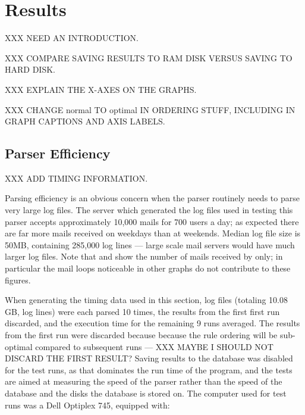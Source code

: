 \section{Results}

XXX NEED AN INTRODUCTION\@.

XXX COMPARE SAVING RESULTS TO RAM DISK VERSUS SAVING TO HARD DISK\@.

XXX EXPLAIN THE X-AXES ON THE GRAPHS\@.

XXX CHANGE normal TO optimal IN ORDERING STUFF, INCLUDING IN GRAPH CAPTIONS
AND AXIS LABELS\@.

\subsection{Parser Efficiency}

\label{parser efficiency}

XXX ADD TIMING INFORMATION\@.

Parsing efficiency is an obvious concern when the parser routinely needs to
parse very large log files.  The server which generated the log files used
in testing this parser accepts approximately 10,000 mails for 700 users a
day; as expected there are far more mails received on weekdays than at
weekends.   Median log file size is 50MB, containing 285,000 log lines ---
large scale mail servers would have much larger log files.  Note that
 and  show the number of mails received by \SMTP{} only; in
particular the mail loops noticeable in other graphs do not contribute to
these figures.



When generating the timing data used in this section, \numberOFlogFILES{}
log files (totaling 10.08 GB, \numberOFlogLINEShuman{} log lines) were each
parsed 10 times, the results from the first first run discarded, and the
execution time for the remaining 9 runs averaged.  The results from the
first run were discarded because because the rule ordering will be
sub-optimal compared to subsequent runs --- XXX MAYBE I SHOULD NOT DISCARD
THE FIRST RESULT\@?  Saving results to the database was disabled for the
test runs, as that dominates the run time of the program, and the tests are
aimed at measuring the speed of the parser rather than the speed of the
database and the disks the database is stored on.  The computer used for
test runs was a Dell Optiplex 745, equipped with: 

